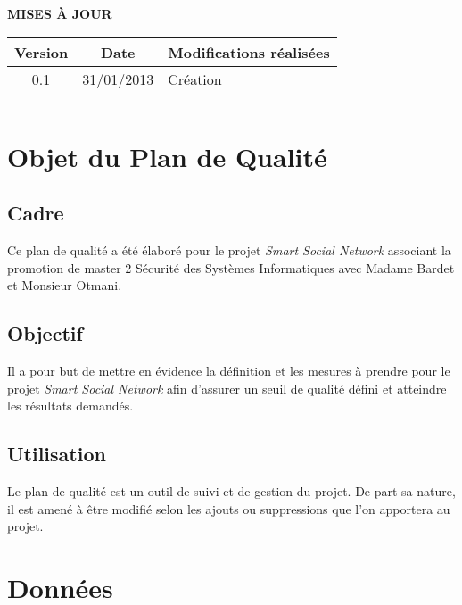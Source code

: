 \documentclass[a4paper,11pt,french]{article}
\begin{document}
\makeFirstPage
\clearpage

\vspace*{1cm}
\begin{center}
\textbf{\huge{MISES À JOUR}}\\
\vspace*{3cm}
	\begin{tabularx}{16cm}{|c|c|X|}
	\hline
	\bfseries{Version} & \bfseries{Date} & \bfseries{Modifications réalisées}\\
	\hline
	0.1 & 31/01/2013 & Création\\
	\hline
	&&\\
	\hline
	&&\\
	\hline
	\end{tabularx}
\end{center}

\clearpage
\tableofcontents
\clearpage

\renewcommand\labelitemi{\textbullet} %
\renewcommand\labelitemii{$\circ$} %
\section{Objet du Plan de Qualité}
\subsection{Cadre}
	Ce plan de qualité a été élaboré pour le projet \emph{Smart Social
Network} associant la promotion de master 2 Sécurité des Systèmes
Informatiques avec Madame Bardet et Monsieur Otmani.

\subsection{Objectif}
	Il a pour but de mettre en évidence la définition et les mesures à
prendre pour le projet \emph{Smart Social Network} afin d'assurer un seuil de
qualité défini et atteindre les résultats demandés.

\subsection{Utilisation}
	Le plan de qualité est un outil de suivi et de gestion du projet.
De part sa nature, il est amené à être modifié selon les ajouts ou 
suppressions que l'on apportera au projet.

\section{Données}
\end{document}
